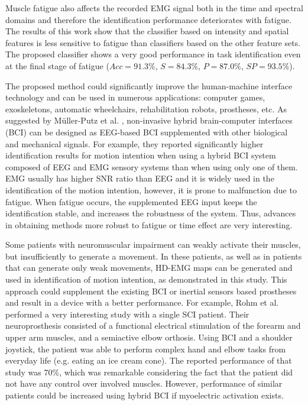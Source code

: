 Muscle fatigue also affects the recorded EMG signal both in the time and spectral domains and therefore the identification performance deteriorates with fatigue. The results of this work show that the classifier based on intensity and spatial features is less sensitive to fatigue than classifiers based on the other feature sets. The proposed classifier shows a very good performance in task identification even at the final stage of fatigue ($Acc = 91.3\%$, $S = 84.3\%$, $P = 87.0\%$, $SP = 93.5\%$).

The proposed method could significantly improve the human-machine interface technology and can be used in numerous applications: computer games, exoskeletons, automatic wheelchairs, rehabilitation robots, prostheses, etc. As suggested by Müller-Putz et al. \citep{Muller-Putz2015}, non-invasive hybrid brain-computer interfaces (BCI) can be designed as EEG-based BCI supplemented with other biological and mechanical signals. For example, they reported significantly higher identification results for motion intention when using a hybrid BCI system composed of EEG and EMG sensory systems than when using only one of them. EMG usually has higher SNR ratio than EEG and it is widely used in the identification of the motion intention, however, it is prone to malfunction due to fatigue. When fatigue occurs, the supplemented EEG input keeps the identification stable, and increases the robustness of the system. Thus, advances in obtaining methods more robust to fatigue or time effect are very interesting.

Some patients with neuromuscular impairment can weakly activate their muscles, but insufficiently to generate a movement. In these patients, as well as in patients that can generate only weak movements, HD-EMG maps can be generated and used in identification of motion intention, as demonstrated in this study. This approach could supplement the existing BCI or inertial sensors based prostheses and result in a device with a better performance. For example, Rohm et al. \citep{Rohm2013} performed a very interesting study with a single SCI patient. Their neuroprosthesis consisted of a functional electrical stimulation of the forearm and upper arm muscles, and a semiactive elbow orthosis. Using BCI and a shoulder joystick, the patient was able to perform complex hand and elbow tasks from everyday life (e.g. eating an ice cream cone). The reported performance of that study was 70\%, which was remarkable considering the fact that the patient did not have any control over involved muscles. However, performance of similar patients could be increased using hybrid BCI if myoelectric activation exists.

